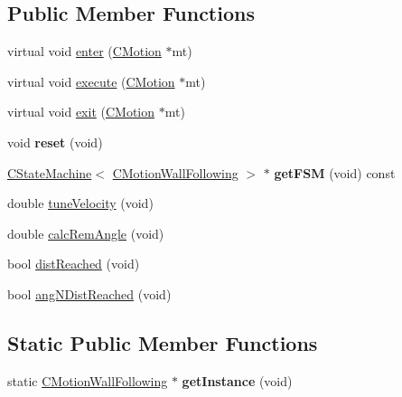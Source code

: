 \subsection*{Public Member Functions}
\begin{DoxyCompactItemize}
\item 
virtual void \mbox{\hyperlink{classmotion_1_1CMotionWallFollowing_ad42584f648abe8826d2c23dad8128484}{enter}} (\mbox{\hyperlink{classmotion_1_1CMotion}{C\+Motion}} $\ast$mt)
\item 
virtual void \mbox{\hyperlink{classmotion_1_1CMotionWallFollowing_a765cfe604941a06056131feb01fea66d}{execute}} (\mbox{\hyperlink{classmotion_1_1CMotion}{C\+Motion}} $\ast$mt)
\item 
virtual void \mbox{\hyperlink{classmotion_1_1CMotionWallFollowing_a24be76c786b3a4bd476cc9b3c8955c26}{exit}} (\mbox{\hyperlink{classmotion_1_1CMotion}{C\+Motion}} $\ast$mt)
\item 
\mbox{\label{classmotion_1_1CMotionWallFollowing_ab85ceaa8803a0850acdc951bd9ebec74}} 
void {\bfseries reset} (void)
\item 
\mbox{\label{classmotion_1_1CMotionWallFollowing_a0ab894226ca05974580ec97ececbda5d}} 
\mbox{\hyperlink{classmotion_1_1CStateMachine}{C\+State\+Machine}}$<$ \mbox{\hyperlink{classmotion_1_1CMotionWallFollowing}{C\+Motion\+Wall\+Following}} $>$ $\ast$ {\bfseries get\+F\+SM} (void) const
\item 
double \mbox{\hyperlink{classmotion_1_1CMotionWallFollowing_a1b29295eff775104bb16c110c3f8b81a}{tune\+Velocity}} (void)
\item 
double \mbox{\hyperlink{classmotion_1_1CMotionWallFollowing_ad8a39e0176c9e6127b8267b1a7a891ac}{calc\+Rem\+Angle}} (void)
\item 
bool \mbox{\hyperlink{classmotion_1_1CMotionWallFollowing_a4fcea1525cdd043f8c0dd8621e3ba09e}{dist\+Reached}} (void)
\item 
bool \mbox{\hyperlink{classmotion_1_1CMotionWallFollowing_aa84fb18a4cea89ad726c18d4f308e4d7}{ang\+N\+Dist\+Reached}} (void)
\end{DoxyCompactItemize}
\subsection*{Static Public Member Functions}
\begin{DoxyCompactItemize}
\item 
\mbox{\label{classmotion_1_1CMotionWallFollowing_a8758349202ccb49d5b0927066b4201cd}} 
static \mbox{\hyperlink{classmotion_1_1CMotionWallFollowing}{C\+Motion\+Wall\+Following}} $\ast$ {\bfseries get\+Instance} (void)
\end{DoxyCompactItemize}


